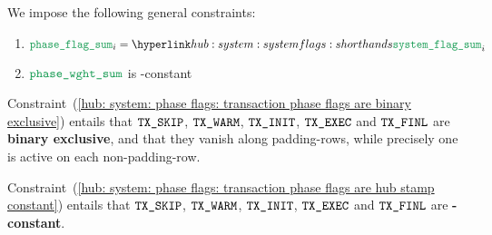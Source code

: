 We impose the following general constraints:
\begin{enumerate}
	\item \label{hub: system: phase flags: transaction phase flags are binary exclusive}   $\phaseSum _{i} = \flagSum _{i}$
	\item \label{hub: system: phase flags: transaction phase flags are hub stamp constant} $\weightedPhaseSum$ is \hubStamp{}-constant
\end{enumerate}
\saNote{}
Constraint~(\ref{hub: system: phase flags: transaction phase flags are binary exclusive})
entails that
$\texttt{TX}\texttt{\_SKIP}$,
$\texttt{TX}\texttt{\_WARM}$,
$\texttt{TX}\texttt{\_INIT}$,
$\texttt{TX}\texttt{\_EXEC}$ and
$\texttt{TX}\texttt{\_FINL}$
are \textbf{binary exclusive}, and that they vanish along padding-rows,
while precisely one is active on each non-padding-row.

\saNote{}
Constraint~(\ref{hub: system: phase flags: transaction phase flags are hub stamp constant})
entails that
$\texttt{TX}\texttt{\_SKIP}$,
$\texttt{TX}\texttt{\_WARM}$,
$\texttt{TX}\texttt{\_INIT}$,
$\texttt{TX}\texttt{\_EXEC}$ and
$\texttt{TX}\texttt{\_FINL}$
are \textbf{\hubStamp-constant}.
